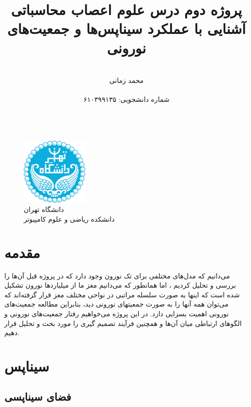 \documentclass[12pt]{article}
\title{\Luge پروژه دوم درس علوم اعصاب محاسباتی\\[1ex]آشنایی با عملکرد سیناپس‌ها و جمعیت‌های نورونی}
\author{\\ \Large{ محمد زمانی}  \\ \\ \Large{شماره دانشجویی: ۶۱۰۳۹۹۱۳۵} \\ \\ }}
\date{}
\begin{document}

	
	\begin{titlingpage}
	
	\begin{figure}
		\centering
		\includegraphics[width=0.3\textwidth]{Figs/University_of_Tehran_logo.png}	
		\caption*{ \LARGE دانشگاه تهران\\ دانشکده ریاضی و علوم کامپیوتر \\}
	\end{figure}	\maketitle
	
	\end{titlingpage}


	\setlength{\parindent}{20pt}
	\tableofcontents
	
	\vspace{1\baselineskip}

	\pagebreak
	\section{مقدمه}
	می‌دانیم که مدل‌های مختلفی برای تک نورون وجود دارد که در پروژه قبل آن‌ها را بررسی و تحلیل کردیم
، اما همانطور که می‌دانیم مغز ما از میلیاردها نورون تشکیل شده است که اینها به صورت سلسله مراتبی در نواحی مختلف مغز قرار گرفتەاند که می‌توان همه آنها را به صورت جمعیتهای
نورونی دید، بنابراین مطالعه جمعیت‌های نورونی اهمیت بسزایی دارد. در این پروژه می‌خواهیم رفتار جمعیت‌های نورونی و الگو‌های ارتباطی میان‌ آن‌ها و همچنین فرآیند تصمیم گیری را مورد بحث و تحلیل قرار دهیم.

	\section{سیناپس}
	
	\subsection{ فضای سیناپسی}
	
\end{document}
